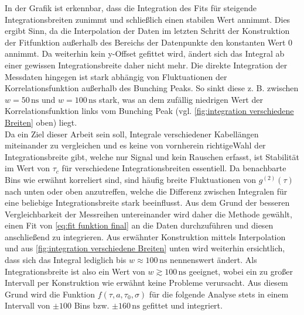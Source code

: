 In der Grafik ist erkennbar, dass die Integration des Fits für steigende Integrationsbreiten zunimmt und schließlich einen stabilen Wert annimmt. 
Dies ergibt Sinn, da die Interpolation der Daten im letzten Schritt der Konstruktion der Fitfunktion außerhalb des Bereichs der Datenpunkte den konstanten Wert 0 annimmt. 
Da weiterhin kein y-Offset gefittet wird, ändert sich das Integral ab einer gewissen Integrationsbreite daher nicht mehr. 
Die direkte Integration der Messdaten hingegen ist stark abhängig von Fluktuationen der Korrelationsfunktion außerhalb des Bunching Peaks. 
So sinkt diese z. B. zwischen $w=50\,\mathrm{ns}$ und $w=100\,\mathrm{ns}$ stark, was an dem zufällig niedrigen Wert der Korrelationsfunktion links vom Bunching Peak (vgl. \autoref{fig:integration verschiedene Breiten} oben) liegt. \\

Da ein Ziel dieser Arbeit sein soll, Integrale verschiedener Kabellängen miteinander zu vergleichen und es keine von vornherein \glqq richtige\grqq\;Wahl der Integrationsbreite gibt, welche nur Signal und kein Rauschen erfasst, ist Stabilität im Wert von $\tau_c$ für verschiedene Integrationsbreiten essentiell. 
Da benachbarte Bins wie erwähnt korreliert sind, sind häufig breite Fluktuationen von $g^{(2)}(\tau)$ nach unten oder oben anzutreffen, welche die Differenz zwischen Integralen für eine beliebige Integrationsbreite stark beeinflusst. 
Aus dem Grund der besseren Vergleichbarkeit der Messreihen untereinander wird daher die Methode gewählt, einen Fit von \autoref{eq:fit funktion final} an die Daten durchzuführen und diesen anschließend zu integrieren. 
Aus erwähnter Konstruktion mittels Interpolation und aus \autoref{fig:integration verschiedene Breiten} unten wird weiterhin ersichtlich, dass sich das Integral lediglich bis $w\approx 100\,\mathrm{ns}$ nennenswert ändert. 
Als Integrationsbreite ist also ein Wert von $w\gtrsim 100\,\mathrm{ns}$ geeignet, wobei ein zu großer Intervall per Konstruktion wie erwähnt keine Probleme verursacht. 
Aus diesem Grund wird die Funktion $f(\tau, a, \tau_0, \sigma)$ für die folgende Analyse stets in einem Intervall von $\pm 100$ Bins bzw. $\pm 160\,\mathrm{ns}$ gefittet und integriert. 

